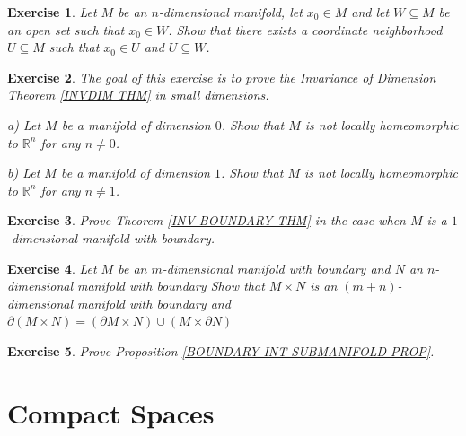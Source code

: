 \documentclass[11pt, letterpaper, oneside]{report}
\renewcommand{\chaptermark}[1]{\markboth{#1}{}}
\theoremstyle{pplain}
\newtheorem{ITERMVALUE THM}[theorem]{Intermediate Value Theorem}
\newtheorem{HEINEBOREL THM}[theorem]{Heine-Borel Theorem}
\newtheorem{UMETR THM}[theorem]{Urysohn Metrization Theorem}
\newtheorem{UMETR2 THM}[theorem]{Urysohn Metrization Theorem (v.2)}
\theoremstyle{ddefinition}
\theoremstyle{nnn}
\newtheorem{TDA NN}[theorem]{Topological Data Analysis. }
\theoremstyle{eexercise}
\newtheorem{exercise}{Exercise}[chapter]
\newcommand{\R}{{\mathbb R}}
\begin{document}
\begin{exercise}
\label{SMALL COORD NBHD EXERCISE}
Let $M$ be an $n$-dimensional manifold, let $x_{0}\in M$ and let $W\subseteq M$
be an open set such that $x_{0}\in W$. Show that there exists a coordinate neighborhood 
$U\subseteq M$ such that $x_{0}\in U$ and $U\subseteq W$.  
\end{exercise}





\begin{exercise}
The goal of this exercise is to prove the Invariance of Dimension Theorem \ref{INVDIM THM}
in small dimensions. 

a)  Let $M$ be a manifold of dimension $0$. Show that $M$  is not locally homeomorphic
to $\R^{n}$ for any $n\neq 0$. 

b) Let $M$ be a manifold of dimension $1$. Show that $M$ is not locally homeomorphic
to $\R^{n}$ for any $n\neq 1$. 
\end{exercise}





\begin{exercise}
Prove Theorem \ref{INV BOUNDARY THM} in the case when $M$ is a $1$-dimensional 
manifold with boundary. 
\end{exercise}





\begin{exercise}
Let $M$ be an $m$-dimensional manifold with boundary and $N$ 
an $n$-dimensional manifold with boundary Show that $M\times N$ is  an $(m+n)$-dimensional manifold 
with boundary and $\partial (M\times N) = (\partial M \times N) \cup (M \times \partial N)$ 
\end{exercise}



\begin{exercise}
Prove Proposition \ref{BOUNDARY INT SUBMANIFOLD PROP}. 
\end{exercise}





\newpage


\chapter{Compact Spaces}
\chaptermark{Compact Spaces}
\end{document}
